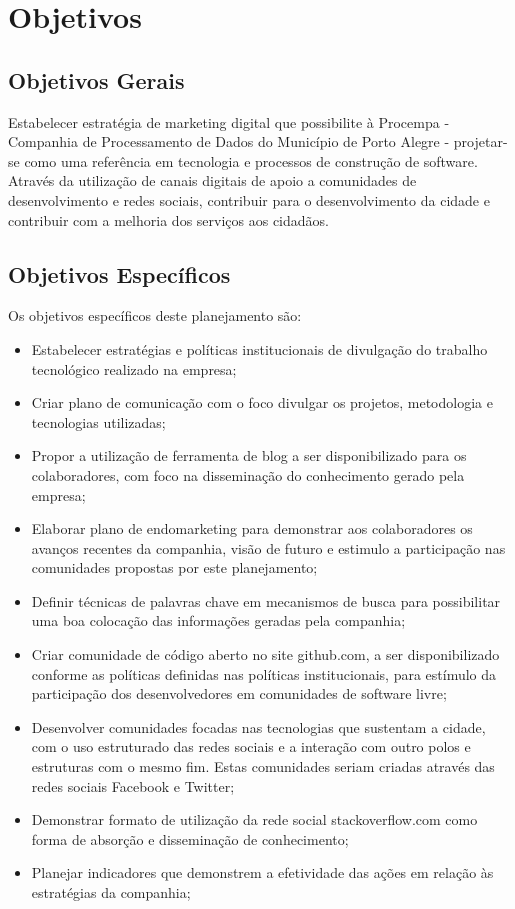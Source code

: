 \chapter{Objetivos}
\section{Objetivos Gerais}
Estabelecer estratégia de marketing digital que possibilite à Procempa - Companhia de Processamento de Dados do Município de Porto Alegre - projetar-se como uma referência em tecnologia e processos de construção de software. Através da utilização de canais digitais de apoio a comunidades de desenvolvimento e redes sociais, contribuir para o desenvolvimento da cidade e contribuir com a melhoria dos serviços aos cidadãos.

\section{Objetivos Específicos}
Os objetivos específicos deste planejamento são:
\begin{itemize}
\item Estabelecer estratégias e políticas institucionais de divulgação do trabalho tecnológico realizado na empresa;
\item Criar plano de comunicação com o foco divulgar os projetos, metodologia e tecnologias utilizadas;
\item Propor a utilização de ferramenta de blog a ser disponibilizado para os colaboradores, com foco na disseminação do conhecimento gerado pela empresa;
\item Elaborar plano de endomarketing para demonstrar aos colaboradores os avanços recentes da companhia, visão de futuro e estimulo a participação nas comunidades propostas por este planejamento;
\item Definir técnicas de palavras chave em mecanismos de busca para possibilitar uma boa colocação das informações geradas pela companhia;
\item Criar comunidade de código aberto no site github.com, a ser disponibilizado conforme as políticas definidas nas políticas institucionais, para estímulo da participação dos desenvolvedores em comunidades de software livre;
\item Desenvolver comunidades focadas nas tecnologias que sustentam a cidade, com o uso estruturado das redes sociais e a interação com outro polos e estruturas com o mesmo fim. Estas comunidades seriam criadas através das redes sociais Facebook e Twitter;
\item Demonstrar formato de utilização da rede social stackoverflow.com como forma de absorção e disseminação de conhecimento;
\item Planejar indicadores que demonstrem a efetividade das ações em relação às estratégias da companhia;
\end{itemize}
